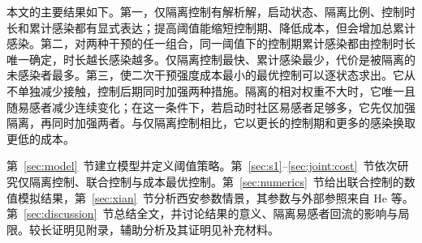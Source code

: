 本文的主要结果如下。第一，仅隔离控制有解析解，启动状态、隔离比例、控制时长和累计感染都有显式表达；提高阈值能缩短控制期、降低成本，但会增加总累计感染。第二，对两种干预的任一组合，同一阈值下的控制期累计感染都由控制时长唯一确定，时长越长感染越多。仅隔离控制最快、累计感染最少，代价是被隔离的未感染者最多。第三，使二次干预强度成本最小的最优控制可以逐状态求出。它从不单独减少接触，控制后期同时加强两种措施。隔离的相对权重不大时，它唯一且随易感者减少连续变化；在这一条件下，若启动时社区易感者足够多，它先仅加强隔离，再同时加强两者。与仅隔离控制相比，它以更长的控制期和更多的感染换取更低的成本。

第~\ref{sec:model}~节建立模型并定义阈值策略。第~\ref{sec:s1}--\ref{sec:joint:cost}~节依次研究仅隔离控制、联合控制与成本最优控制。第~\ref{sec:numerics}~节给出联合控制的数值模拟结果，第~\ref{sec:xian}~节分析西安参数情景，其参数与外部参照来自 He 等\cite{He2023TDINN}。第~\ref{sec:discussion}~节总结全文，并讨论结果的意义、隔离易感者回流的影响与局限。较长证明见附录，辅助分析及其证明见补充材料。
